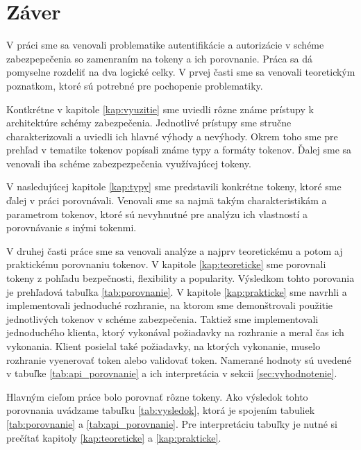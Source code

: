 \chapter*{Záver}  %

V práci sme sa venovali problematike autentifikácie a autorizácie v schéme zabezpepečenia so zamenraním na tokeny a ich porovnanie. Práca sa dá pomyselne rozdeliť na dva logické celky. V prvej časti sme sa venovali teoretickým poznatkom, ktoré sú potrebné pre pochopenie problematiky. 

Kontkrétne v kapitole \ref{kap:vyuzitie} sme uviedli rôzne známe prístupy k architektúre schémy zabezpečenia. Jednotlivé prístupy sme stručne charakterizovali a uviedli ich hlavné výhody a nevýhody. Okrem toho sme pre prehľad v tematike tokenov popísali známe typy a formáty tokenov. Ďalej sme sa venovali iba schéme zabezpezpečenia využívajúcej tokeny.

V nasledujúcej kapitole \ref{kap:typy} sme predstavili konkrétne tokeny, ktoré sme ďalej v práci porovnávali. Venovali sme sa najmä takým charakteristikám a parametrom tokenov, ktoré sú nevyhnutné pre analýzu ich vlastností a porovnávanie s inými tokenmi.

V druhej časti práce sme sa venovali analýze a najprv teoretickému a potom aj praktickému porovnaniu tokenov. V kapitole \ref{kap:teoreticke} sme porovnali tokeny z pohľadu bezpečnosti, flexibility a popularity. Výsledkom tohto porovania je prehľadová tabuľka \ref{tab:porovnanie}. V kapitole \ref{kap:prakticke} sme navrhli a implementovali jednoduché rozhranie, na ktorom sme demonštrovali použitie jednotlivých tokenov v schéme zabezpečenia. Taktiež sme implementovali jednoduchého klienta, ktorý vykonával požiadavky na rozhranie a meral čas ich vykonania. Klient posielal také požiadavky, na ktorých vykonanie, muselo rozhranie vyenerovať token alebo validovať token. Namerané hodnoty sú uvedené v tabuľke \ref{tab:api_porovnanie} a ich interpretácia v sekcii \ref{sec:vyhodnotenie}.

Hlavným cieľom práce bolo porovnať rôzne tokeny. Ako výsledok tohto porovnania uvádzame tabuľku \ref{tab:vysledok}, ktorá je spojením tabuliek \ref{tab:porovnanie} a \ref{tab:api_porovnanie}. Pre interpretáciu tabuľky je nutné si prečítať kapitoly \ref{kap:teoreticke} a \ref{kap:prakticke}.

